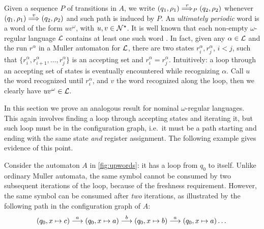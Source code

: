 %
%
{
Given a sequence $P$ of transitions in $A$, we write $(q_1,\rho_1) \overset{v}{\Longrightarrow}_{P} (q_2,\rho_2)$ whenever $(q_1,\rho_1) \overset{v}{\Longrightarrow} (q_2,\rho_2)$ and such path is induced by $P$.
}
%
An \emph{ultimately periodic} word is a word of the form $uv^\omega$, with $u,v \in \mathcal{N}^\star$.  It is well known that each non-empty $\omega$-regular language $\mathcal{L}$ contains at least one such word \cite{CalbrixNP93}. In fact, given any $\alpha \in \mathcal{L}$ and the run $r^\alpha$ in a Muller automaton for $\mathcal{L}$, there are two states $r^\alpha_i,r^\alpha_j$, $i<j$, such that $\{r^\alpha_i,r^\alpha_{i+1},\dots,r^\alpha_j\}$ is an accepting set and $r^\alpha_i = r^\alpha_j$. Intuitively: a loop through an accepting set of states is eventually encountered while recognizing $\alpha$. Call $u$ the word recognized until $r^\alpha_i$, and $v$ the word recognized along the loop, then we clearly have $uv^\omega \in \mathcal{L}$.

In this section we prove an analogous result for nominal $\omega$-regular languages. This again involves finding a loop through accepting states and iterating it, but such loop must be in the configuration graph, i.e.\ it must be a path starting and ending with the same state \emph{and} register assignment. The following example gives evidence of this point.
%

\begin{example}
Consider the automaton $A$ in \cref{fig:upwords}: it has a loop from $q_0$ to itself. Unlike ordinary Muller automata, the same symbol cannot be consumed by two subsequent iterations of the loop, because of the freshness requirement. However, the same symbol can be consumed after \emph{two} iterations, as illustrated by the following path in the configuration graph of $A$:
\[
	(q_0,x \mapsto c) \overset{a}{\longrightarrow} (q_0,x \mapsto a) \overset{b}{\longrightarrow} (q_0,x \mapsto b) \overset{a}{\longrightarrow} (q_0,x \mapsto a) \dots
\]
\end{example}



